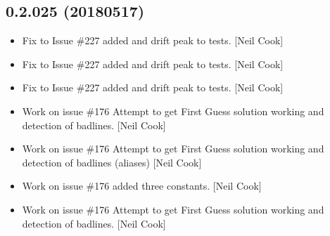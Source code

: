 \documentclass[a4paper,10pt,english]{report}
\begin{document}
\subsection{0.2.025 (2018\sphinxhyphen{}05\sphinxhyphen{}17)}
\label{\detokenize{misc/changelog:id454}}\begin{itemize}
\item {} 
Fix to Issue \#227 \sphinxhyphen{} added  and drift peak to tests. {[}Neil
Cook{]}

\item {} 
Fix to Issue \#227 \sphinxhyphen{} added  and drift peak to tests. {[}Neil
Cook{]}

\item {} 
Fix to Issue \#227 \sphinxhyphen{} added  and drift peak to tests. {[}Neil
Cook{]}

\item {} 
Work on issue \#176 \sphinxhyphen{} Attempt to get First Guess solution working and
detection of badlines. {[}Neil Cook{]}

\item {} 
Work on issue \#176 \sphinxhyphen{} Attempt to get First Guess solution working and
detection of badlines (aliases) {[}Neil Cook{]}

\item {} 
Work on issue \#176 \sphinxhyphen{} added three  constants. {[}Neil Cook{]}

\item {} 
Work on issue \#176 \sphinxhyphen{} Attempt to get First Guess solution working and
detection of badlines. {[}Neil Cook{]}

\end{itemize}
\end{document}
